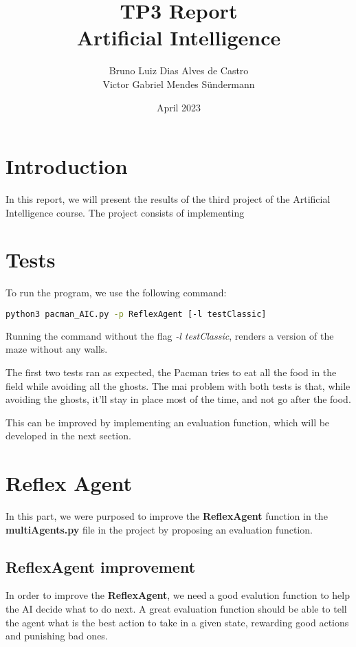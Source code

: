 \documentclass{article}
\title{\huge TP3 Report \\ Artificial Intelligence}
\author{Bruno Luiz Dias Alves de Castro \\ Victor Gabriel Mendes Sündermann}
\date{April 2023}
\begin{document}
\maketitle

\section{Introduction}

In this report, we will present the results of the third project of the Artificial Intelligence course. The project consists of implementing

\section{Tests}
To run the program, we use the following command:

\hbox{}

\begin{lstlisting}[language=bash, frame=tlbr, framesep=6pt, backgroundcolor=\color{light-gray}]
    python3 pacman_AIC.py -p ReflexAgent [-l testClassic]
\end{lstlisting}

\hbox{}

Running the command without the flag \textit{-l testClassic}, renders a version of the maze without any walls.

The first two tests ran as expected, the Pacman tries to eat all the food in the field while avoiding all the ghosts. The mai problem with both tests is that, while avoiding the ghosts, it'll stay in place most of the time, and not go after the food.

This can be improved by implementing an evaluation function, which will be developed in the next section.

\section{Reflex Agent}

In this part, we were purposed to improve the \textbf{ReflexAgent} function in the \textbf{multiAgents.py} file in the project by proposing an evaluation function.

\subsection{ReflexAgent improvement}

In order to improve the \textbf{ReflexAgent}, we need a good evalution function to help the AI decide what to do next. A great evaluation function should be able to tell the agent what is the best action to take in a given state, rewarding good actions and punishing bad ones.
\end{document}
